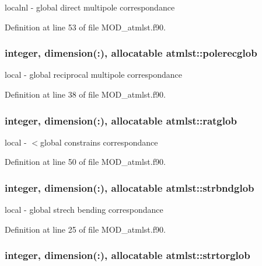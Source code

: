 localnl -\/ global direct multipole correspondance 



Definition at line 53 of file M\-O\-D\-\_\-atmlst.\-f90.

\hypertarget{classatmlst_a6aa66bdf6ac0461505594cd330c53eba}{
\subsubsection[{polerecglob}]{\setlength{\rightskip}{0pt plus 5cm}integer, dimension(\-:), allocatable atmlst\-::polerecglob}}\label{classatmlst_a6aa66bdf6ac0461505594cd330c53eba}


local -\/ global reciprocal multipole correspondance 



Definition at line 38 of file M\-O\-D\-\_\-atmlst.\-f90.

\hypertarget{classatmlst_a3ee68ae20a26265fc2ce8eed93f5cbec}{
\subsubsection[{ratglob}]{\setlength{\rightskip}{0pt plus 5cm}integer, dimension(\-:), allocatable atmlst\-::ratglob}}\label{classatmlst_a3ee68ae20a26265fc2ce8eed93f5cbec}


local -\/ $<$global constrains correspondance 



Definition at line 50 of file M\-O\-D\-\_\-atmlst.\-f90.

\hypertarget{classatmlst_a1291aa016a7d1f33b0f9ddbee54fcb02}{
\subsubsection[{strbndglob}]{\setlength{\rightskip}{0pt plus 5cm}integer, dimension(\-:), allocatable atmlst\-::strbndglob}}\label{classatmlst_a1291aa016a7d1f33b0f9ddbee54fcb02}


local -\/ global strech bending correspondance 



Definition at line 25 of file M\-O\-D\-\_\-atmlst.\-f90.

\hypertarget{classatmlst_a988c3d46cbd1e50d1777e843505f22ca}{
\subsubsection[{strtorglob}]{\setlength{\rightskip}{0pt plus 5cm}integer, dimension(\-:), allocatable atmlst\-::strtorglob}}\label{classatmlst_a988c3d46cbd1e50d1777e843505f22ca}


